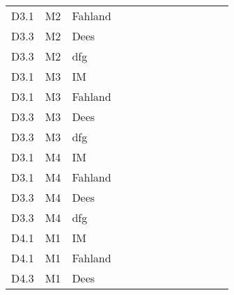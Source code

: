 \begin{table}[]
{\begin{tabular}{lll|llllllll|ll}
			D3.1      & M2              & Fahland   &     &    &     &     &        &           &          &      &                   &                     \\
			D3.3      & M2              & Dees      &     &    &     &     &        &           &          &      &                   &                     \\
			D3.3      & M2              & dfg       &     &    &     &     &        &           &          &      &                   &                     \\
			D3.1      & M3              & IM  &     &    &     &     &        &           &          &      &                   &                     \\
			D3.1      & M3              & Fahland   &     &    &     &     &        &           &          &      &                   &                     \\
			D3.3      & M3              & Dees      &     &    &     &     &        &           &          &      &                   &                     \\
			D3.3      & M3              & dfg       &     &    &     &     &        &           &          &      &                   &                     \\
			D3.1      & M4              & IM  &     &    &     &     &        &           &          &      &                   &                     \\
			D3.1      & M4              & Fahland   &     &    &     &     &        &           &          &      &                   &                     \\
			D3.3      & M4              & Dees      &     &    &     &     &        &           &          &      &                   &                     \\
			D3.3      & M4              & dfg       &     &    &     &     &        &           &          &      &                   &                     \\
			D4.1      & M1              & IM &     &    &     &     &        &           &          &      &                   &                     \\
			D4.1      & M1              & Fahland   &     &    &     &     &        &           &          &      &                   &                     \\
			D4.3      & M1              & Dees      &     &    &     &     &        &           &          &      &                   &                     \\

\end{tabular}}
\end{table}
